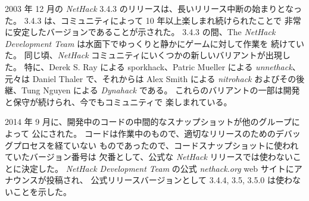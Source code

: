 \medskip
2003 年 12 月の {\it NetHack\/} 3.4.3 のリリースは、長いリリース中断の始まりとなった。
3.4.3 は、コミュニティによって 10 年以上楽しまれ続けられたことで
非常に安定したバージョンであることが示された。
3.4.3 の間、The {\it NetHack Development Team} は水面下でゆっくりと静かにゲームに対して作業を
続けていた。
同じ頃、{\it NetHack\/} コミュニティにいくつかの新しいバリアントが出現した。
特に、Derek S. Ray による sporkhack、Patric Mueller による {\it unnethack\/}、
元々は Daniel Thaler で、それからは Alex Smith による
{\it nitrohack\/} およびその後継、Tung Nguyen による {\it Dynahack\/} である。
これらのバリアントの一部は開発と保守が続けられ、今でもコミュニティで
楽しまれている。

\medskip
2014 年 9 月に、開発中のコードの中間的なスナップショットが他のグループによって
公にされた。
コードは作業中のもので、適切なリリースのためのデバッグプロセスを経ていない
ものであったので、コードスナップショットに使われていたバージョン番号は
欠番として、公式な {\it NetHack\/} リリースでは使わないことに決定した。
{\it NetHack Development Team} の公式 {\it nethack.org\/} web サイトにアナウンスが投稿され、
公式リリースバージョンとして 3.4.4, 3.5, 3.5.0 は使わないことを示した。

